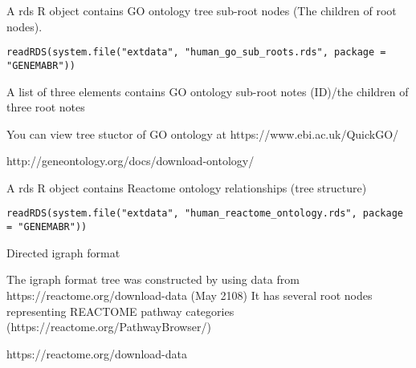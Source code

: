\documentclass[a4paper]{book}
\begin{document}
%
\begin{Description}\relax
A rds R object contains GO ontology tree sub-root nodes (The children of root nodes).
\end{Description}
%
\begin{Usage}
\begin{verbatim}
readRDS(system.file("extdata", "human_go_sub_roots.rds", package = "GENEMABR"))
\end{verbatim}
\end{Usage}
%
\begin{Format}
A list of three elements contains GO ontology sub-root notes (ID)/the children of three root notes
\end{Format}
%
\begin{Details}\relax
You can view tree stuctor of GO ontology at  https://www.ebi.ac.uk/QuickGO/
\end{Details}
%
\begin{Source}\relax
http://geneontology.org/docs/download-ontology/
\end{Source}
%
\begin{Description}\relax
A rds R object contains Reactome ontology relationships (tree structure)
\end{Description}
%
\begin{Usage}
\begin{verbatim}
readRDS(system.file("extdata", "human_reactome_ontology.rds", package = "GENEMABR"))
\end{verbatim}
\end{Usage}
%
\begin{Format}
Directed igraph format
\end{Format}
%
\begin{Details}\relax
The igraph format tree was constructed by using  data from https://reactome.org/download-data (May 2108)
It has several root nodes representing REACTOME pathway categories (https://reactome.org/PathwayBrowser/)
\end{Details}
%
\begin{Source}\relax
https://reactome.org/download-data
\end{Source}
\end{document}
